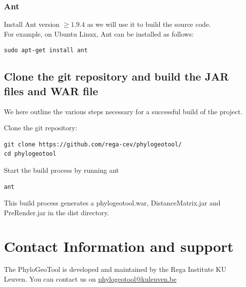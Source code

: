 \documentclass[a4paper, 11pt]{article} %
\begin{document}
\subsubsection*{Ant}
Install Ant version $\geq 1.9.4$ as we will use it to build the source code.\\

\noindent For example, on Ubuntu Linux, Ant can be installed as follows:
\begin{verbatim}
sudo apt-get install ant
\end{verbatim}

\subsection{Clone the git repository and build the JAR files and WAR file}
We here outline the various steps necessary for a successful build of the project.
\begin{itemize}
\item {Clone the git repository: 
\begin{verbatim}
git clone https://github.com/rega-cev/phylogeotool/
cd phylogeotool
\end{verbatim}
\item{Start the build process by running ant}
\begin{verbatim}
ant
\end{verbatim}
\item This build process generates a phylogeotool.war, DistanceMatrix.jar and PreRender.jar in the dist directory.
}
\end{itemize}


\section{Contact Information and support }


The PhyloGeoTool is developed and maintained by the Rega Institute KU Leuven.
You can contact us on \href{mailto:phylogeotool@kuleuven.be}{phylogeotool@kuleuven.be}
\end{document}
